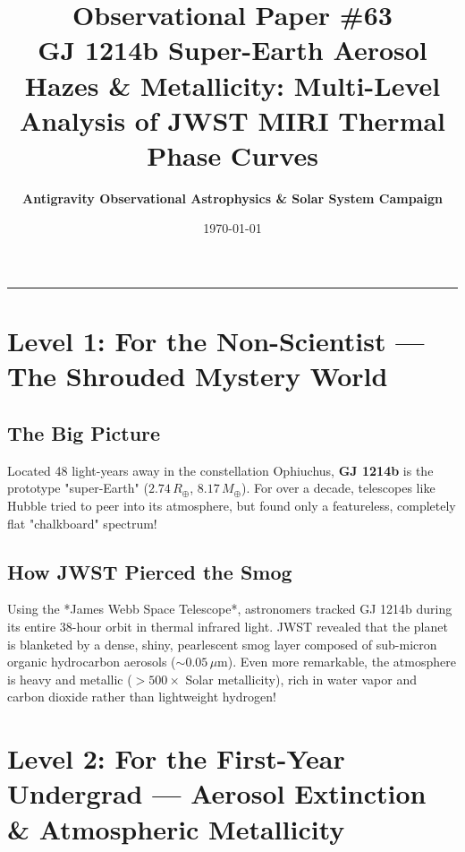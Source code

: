 \documentclass[11pt,a4paper]{article}
\title{\Huge \textbf{Observational Paper \#63}\\ \Large GJ 1214b Super-Earth Aerosol Hazes \& Metallicity: Multi-Level Analysis of JWST MIRI Thermal Phase Curves}
\author{\textbf{Antigravity Observational Astrophysics \& Solar System Campaign}}
\date{\today}
\begin{document}
\maketitle

\vspace{-1em}
\begin{center}
\rule{\textwidth}{1.5pt}
\end{center}

\section*{Level 1: For the Non-Scientist — The Shrouded Mystery World}

\subsection*{The Big Picture}
Located 48 light-years away in the constellation Ophiuchus, \textbf{GJ 1214b} is the prototype "super-Earth" ($2.74\,R_\oplus$, $8.17\,M_\oplus$). For over a decade, telescopes like Hubble tried to peer into its atmosphere, but found only a featureless, completely flat "chalkboard" spectrum!

\subsection*{How JWST Pierced the Smog}
Using the *James Webb Space Telescope*, astronomers tracked GJ 1214b during its entire 38-hour orbit in thermal infrared light. JWST revealed that the planet is blanketed by a dense, shiny, pearlescent smog layer composed of sub-micron organic hydrocarbon aerosols ($\sim 0.05\,\mu\mathrm{m}$). Even more remarkable, the atmosphere is heavy and metallic ($>500\times$ Solar metallicity), rich in water vapor and carbon dioxide rather than lightweight hydrogen!

\newpage

\section*{Level 2: For the First-Year Undergrad — Aerosol Extinction \& Atmospheric Metallicity}
\end{document}
